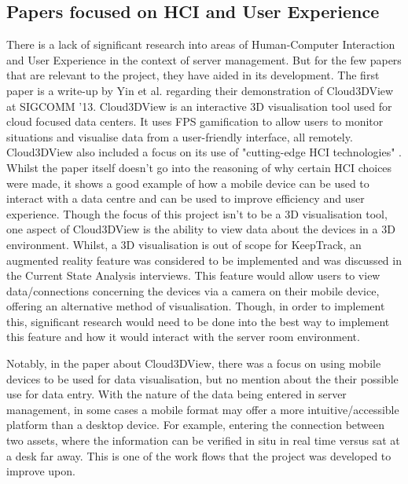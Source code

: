\documentclass [11pt,a4paper]{article}
\begin{document}
\subsection{Papers focused on HCI and User Experience}
\label{sec:HCI}
There is a lack of significant research into areas of Human-Computer Interaction and User Experience in the context of server management. But for the few papers that are relevant to the project, they have aided in its development. The first paper is a write-up by Yin et al. \cite{cloud3dview} regarding their demonstration of Cloud3DView at SIGCOMM '13. Cloud3DView is an interactive 3D visualisation tool used for cloud focused data centers. It uses FPS gamification to allow users to monitor situations and visualise data from a user-friendly interface, all remotely. Cloud3DView also included a focus on its use of "cutting-edge HCI technologies" \cite{cloud3dview}. Whilst the paper itself doesn't go into the reasoning of why certain HCI choices were made, it shows a good example of how a mobile device can be used to interact with a data centre and can be used to improve efficiency and user experience. Though the focus of this project isn't to be a 3D visualisation tool, one aspect of Cloud3DView is the ability to view data about the devices in a 3D environment. Whilst, a 3D visualisation is out of scope for KeepTrack, an augmented reality feature was considered to be implemented and was discussed in the Current State Analysis interviews. This feature would allow users to view data/connections concerning the devices via a camera on their mobile device, offering an alternative method of visualisation. Though, in order to implement this, significant research would need to be done into the best way to implement this feature and how it would interact with the server room environment.

Notably, in the paper about Cloud3DView, there was a focus on using mobile devices to be used for data visualisation, but no mention about the their possible use for data entry. With the nature of the data being entered in server management, in some cases a mobile format may offer a more intuitive/accessible platform than a desktop device. For example, entering the connection between two assets, where the information can be verified in situ in real time versus sat at a desk far away. This is one of the work flows that the project was developed to improve upon.
\end{document}
